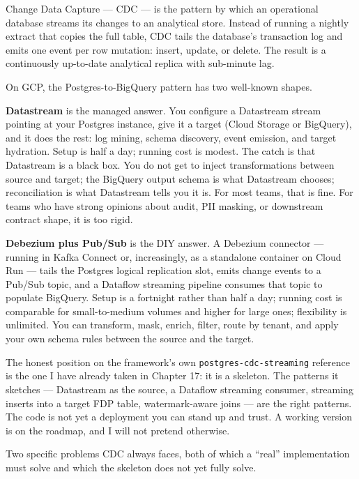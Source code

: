 \documentclass[
  11pt,
  british,
  oneside]{book}
\begin{document}
Change Data Capture --- CDC --- is the pattern by which an
operational database streams its changes to an analytical store. Instead
of running a nightly extract that copies the full table, CDC tails the
database's transaction log and emits one event per row mutation: insert,
update, or delete. The result is a continuously up-to-date analytical
replica with sub-minute lag.

On GCP, the Postgres-to-BigQuery pattern has two well-known shapes.

\textbf{Datastream} is the managed answer. You
configure a Datastream stream pointing at your Postgres instance, give
it a target (Cloud Storage or BigQuery), and it does the rest: log
mining, schema discovery, event emission, and target hydration. Setup is
half a day; running cost is modest. The catch is that Datastream is a
black box. You do not get to inject transformations between source and
target; the BigQuery output schema is what Datastream chooses;
reconciliation is what Datastream tells you it is. For most teams, that
is fine. For teams who have strong opinions about audit, PII masking, or
downstream contract shape, it is too rigid.

\textbf{Debezium plus Pub/Sub} is the DIY answer. A
Debezium connector --- running in Kafka Connect or, increasingly, as a
standalone container on Cloud Run --- tails the Postgres logical
replication slot, emits change events to a Pub/Sub topic, and a Dataflow
streaming pipeline consumes that topic to populate BigQuery. Setup is a
fortnight rather than half a day; running cost is comparable for
small-to-medium volumes and higher for large ones; flexibility is
unlimited. You can transform, mask, enrich, filter, route by tenant, and
apply your own schema rules between the source and the target.

The honest position on the framework's own
\texttt{postgres-cdc-streaming} reference
is the one I have already taken in Chapter 17: it is a skeleton. The
patterns it sketches --- Datastream as the source, a Dataflow streaming
consumer, streaming inserts into a target FDP table, watermark-aware
joins --- are the right patterns. The code is not yet a deployment you
can stand up and trust. A working version is on the roadmap, and I will
not pretend otherwise.

Two specific problems CDC always faces, both of which a ``real''
implementation must solve and which the skeleton does not yet fully
solve.
\end{document}
